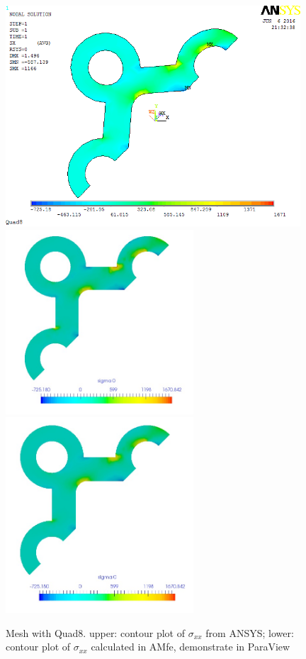 \begin{figure}[htbp]
	\begin{center}
		\includegraphics[width=11cm,clip]{Quad8_Sxx.png} 
		\includegraphics[width=7cm,clip]{Quad8_Sxx_PD.png} 			
		\includegraphics[width=7cm,clip]{Quad8_Sxx_P.png} 		
		\caption{Mesh with Quad8. upper: contour plot of $\sigma_{xx}$ from ANSYS; lower: contour plot of $\sigma_{xx}$ calculated in AMfe, demonstrate in ParaView} \label{fig: Quad8_Sxx}
	\end{center}
\end{figure}
\clearpage 

